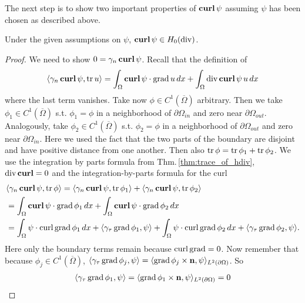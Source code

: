\documentclass[../master_thesis.tex]{subfiles}
\begin{document}
The next step is to show two important properties of $\veccurl \psi$ 
assuming $\psi$ has been chosen as described above.
\begin{proposition}
    Under the given assumptions on $\psi$, $\veccurl\psi \in H_0(\diver)$.
\end{proposition}
\begin{proof}
    We need to show $0 = \gamma_n \veccurl \psi$. Recall that the definition of 
    \begin{align*}
        \langle \gamma_n \veccurl \psi , \tr u \rangle 
        = \int_\Omega \veccurl \psi \cdot \grad u \, dx 
            + \int_\Omega \diver \veccurl \psi \, u \, dx 
    \end{align*}
    where the last term vanishes. Take now $\phi \in C^1(\overline{\Omega})$ 
    arbitrary. Then we take $\phi_1 \in C^1(\overline{\Omega})$ s.t. $\phi_1 = \phi$ in 
    a neighborhood of $\partial \Omega_{in}$ and zero near $\partial \Omega_{out}$. 
    Analogously, take $\phi_2 \in C^1(\overline{\Omega})$ s.t. $\phi_2 = \phi$ in 
    a neighborhood of $\partial \Omega_{out}$ and zero near $\partial \Omega_{in}$. Here we used the fact that 
    the two parts of the boundary are disjoint and have positive distance from one another.
    Then also $\tr \phi = \tr \phi_1 + \tr \phi_2$.
    We use the integration by parts formula from Thm.\,\ref{thm:trace_of_hdiv}, $\diver \veccurl = 0$ and the 
    integration-by-parts formula for the curl
    \begin{align*}
        &\langle \gamma_n \veccurl \psi , \tr \phi \rangle 
        = \langle \gamma_n \veccurl \psi , \tr \phi_1 \rangle + \langle \gamma_n \veccurl \psi , \tr \phi_2 \rangle
        \\ &= \int_\Omega \veccurl \psi \cdot \grad \phi_1 \, dx + \int_\Omega \veccurl \psi \cdot \grad \phi_2 \, dx
        \\ &= \int_\Omega \psi \cdot \curl \grad \phi_1 \, dx + \langle \gamma_\tau \grad \phi_1, \psi \rangle
            + \int_\Omega \psi \cdot \curl \grad \phi_2 \, dx + \langle \gamma_\tau \grad \phi_2, \psi \rangle.
    \end{align*}
    Here only the boundary terms remain because $\curl \grad =0$.
    Now remember that because $\phi_j \in C^1(\overline{\Omega})$, 
    $\langle \gamma_\tau \grad \phi_j, \psi \rangle 
    = \langle \grad \phi_j \times \mathbf{n}, \psi \rangle_{L^2(\partial \Omega)}$. So 
    \begin{align*}
        \langle \gamma_\tau \grad \phi_1, \psi \rangle 
        = \langle \grad \phi_1 \times \mathbf{n}, \psi \rangle_{L^2(\partial \Omega)} = 0

\end{align*}
\end{proof}
\end{document}
